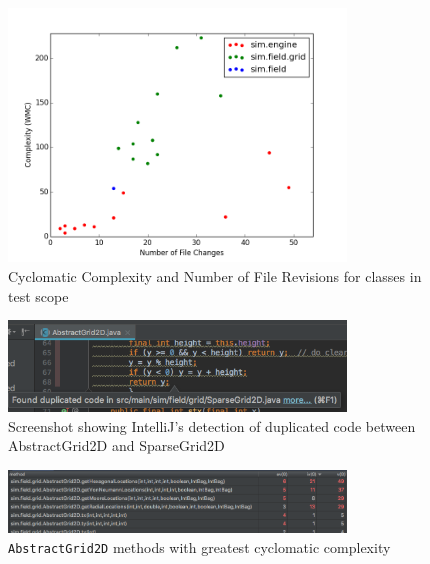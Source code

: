 \documentclass[11pt]{article}
\begin{document}
\begin{figure}[htp]
\centering
\includegraphics[width=0.8\textwidth]{Appendix/complexityVchange}
\caption{Cyclomatic Complexity and Number of File Revisions for classes in test scope}
\label{fig:complexityVchange}
\end{figure}

\begin{figure}[htp]
\centering
\includegraphics[width=0.8\textwidth]{Appendix/duplicated_code}
\caption{Screenshot showing IntelliJ's detection of duplicated code between AbstractGrid2D and SparseGrid2D}
\label{fig:dupe_code}
\end{figure}

\begin{figure}[htp]
\centering
\includegraphics[width=0.8\textwidth]{Appendix/method_complexity}
\caption{\texttt{AbstractGrid2D} methods with greatest cyclomatic complexity}
\label{fig:method_complexity}
\end{figure}
\end{document}
